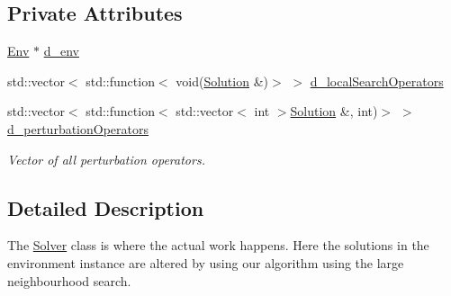 \subsection*{Private Attributes}
\begin{DoxyCompactItemize}
\item 
\hyperlink{class_env}{Env} $\ast$ \hyperlink{class_solver_a00149486de31a8a01a5eb732a8ef0dae}{d\+\_\+env}
\item 
std\+::vector$<$ std\+::function$<$ void(\hyperlink{class_solution}{Solution} \&)$>$ $>$ \hyperlink{class_solver_ae7a9ecebd1a5c4048c8d74f4176700b9}{d\+\_\+local\+Search\+Operators}
\item 
\mbox{\label{class_solver_a3dc9e044184f8159a310b18f8a0abe57}} 
std\+::vector$<$ std\+::function$<$ std\+::vector$<$ int $>$\hyperlink{class_solution}{Solution} \&, int)$>$ $>$ \hyperlink{class_solver_a3dc9e044184f8159a310b18f8a0abe57}{d\+\_\+perturbation\+Operators}
\begin{DoxyCompactList}\small\item\em Vector of all perturbation operators. \end{DoxyCompactList}\end{DoxyCompactItemize}


\subsection{Detailed Description}
The \hyperlink{class_solver}{Solver} class is where the actual work happens. Here the solutions in the environment instance are altered by using our algorithm using the large neighbourhood search. 

